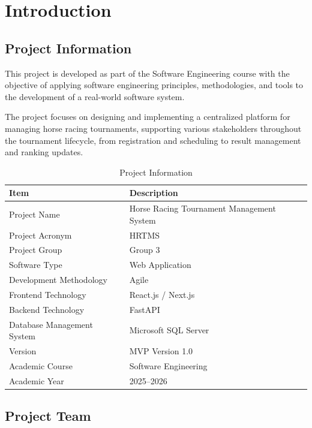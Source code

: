 
\chapter{Introduction}

\section{Project Information}

This project is developed as part of the Software Engineering course with the objective of applying software engineering principles, methodologies, and tools to the development of a real-world software system.

The project focuses on designing and implementing a centralized platform for managing horse racing tournaments, supporting various stakeholders throughout the tournament lifecycle, from registration and scheduling to result management and ranking updates.

\begin{table}[H]
	\centering
	\caption{Project Information}
	\begin{tabular}{|p{5cm}|p{8cm}|}
		\hline
		\textbf{Item} & \textbf{Description} \\
		\hline
		Project Name & Horse Racing Tournament Management System \\
		\hline
		Project Acronym & HRTMS \\
		\hline
		Project Group & Group 3 \\
		\hline
		Software Type & Web Application \\
		\hline
		Development Methodology & Agile \\
		\hline
		Frontend Technology & React.js / Next.js \\
		\hline
		Backend Technology & FastAPI \\
		\hline
		Database Management System & Microsoft SQL Server \\
		\hline
		Version & MVP Version 1.0 \\
		\hline
		Academic Course & Software Engineering \\
		\hline
		Academic Year & 2025--2026 \\
		\hline
	\end{tabular}
\end{table}

\section{Project Team}

